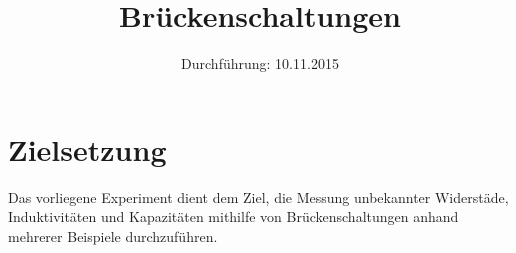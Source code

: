 

\subject{Versuchsprotokoll zum Versuch Nr. 302}
\title{Brückenschaltungen}
\date{
  Durchführung: 10.11.2015
}



\maketitle
\newpage

\section{Zielsetzung}
Das vorliegene Experiment dient dem Ziel, die Messung unbekannter Widerstäde, Induktivitäten und Kapazitäten mithilfe von Brückenschaltungen anhand mehrerer Beispiele durchzuführen.






\printbibliography


